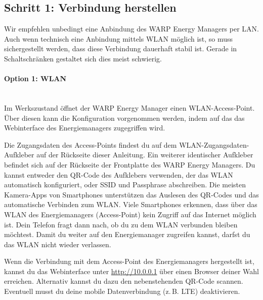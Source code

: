 \documentclass[a4paper,10pt]{article}
\newcommand{\hint}[1]{\begin{tcolorbox}[colback=boxgray,colframe=black,coltext=
white,title=Hinweis,left*=2mm,right*=2mm,boxsep=1mm,bottom=1mm,top=1mm]#1\end{tcolorbox}}
\begin{document}
\begin{multicols*}{2}
	\subsection{Schritt 1: Verbindung herstellen}


	\hint{Wir empfehlen unbedingt eine Anbindung des WARP Energy Managers per
	LAN. Auch wenn technisch eine Anbindung mittels WLAN möglich ist, so muss
	sichergestellt werden, dass diese Verbindung dauerhaft stabil ist. Gerade in
	Schaltschränken gestaltet sich dies meist schwierig.}

	\paragraph{Option 1: WLAN}\ \\
	Im Werkszustand öffnet der WARP Energy Manager einen WLAN-Access-Point. Über diesen kann
	die Konfiguration vorgenommen werden, indem auf das das Webinterface des
	Energiemanagers zugegriffen wird.

	Die Zugangsdaten des Access-Points findest du auf dem WLAN-Zugangsdaten-Aufkleber
	auf der Rückseite dieser Anleitung. Ein weiterer identischer Aufkleber
	befindet sich auf der Rückseite der Frontplatte des WARP Energy Managers.
	Du kannst entweder den QR-Code des Aufklebers verwenden,
	der das WLAN automatisch konfiguriert, oder SSID und Passphrase abschreiben.
	Die meisten Kamera-Apps von Smartphones unterstützen das Auslesen des
	QR-Codes und das automatische Verbinden zum WLAN. Viele Smartphones
	erkennen, dass über das WLAN des Energiemanagers (Access-Point) kein Zugriff auf das
	Internet möglich ist. Dein Telefon fragt dann nach, ob du zu dem WLAN
	verbunden bleiben möchtest. Damit du weiter auf den Energiemanager zugreifen
	kannst, darfst du das WLAN nicht wieder verlassen.

	\begin{minipage}{0.35\textwidth}
		Wenn die Verbindung mit dem Access-Point des Energiemanagers hergestellt ist, kannst du das Webinterface
		unter \url{http://10.0.0.1} über einen Browser deiner Wahl erreichen.
		Alternativ kannst du dazu den nebenstehenden QR-Code scannen.
		Eventuell musst du deine mobile Datenverbindung (z.\,B. LTE) deaktivieren.
	\end{minipage}\hfill
	\begin{minipage}{0.12\textwidth}
		\begin{flushright}
		\end{flushright}
	\end{minipage}


\end{multicols*}
\end{document}
